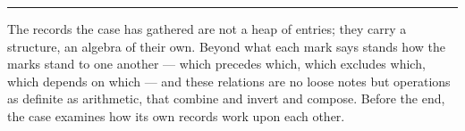 %
%
%
%

\bigskip
\begin{center}
\rule{0.4\textwidth}{0.4pt}
\end{center}
\bigskip

\noindent The records the case has gathered are not a heap of entries; they carry a structure, an algebra of
their own. Beyond what each mark says stands how the marks stand to one another --- which precedes which, which
excludes which, which depends on which --- and these relations are no loose notes but operations as definite as
arithmetic, that combine and invert and compose. Before the end, the case examines how its own records work upon
each other.

